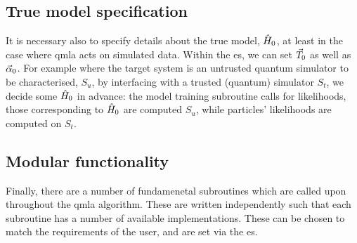 \subsection{True model specification}
It is necessary also to specify details about the \gls{true model}, $\hat{H}_0$, 
    at least in the case where \gls{qmla} acts on simulated data. 
Within the \gls{es}, we can set ${ \vec{T} }_0$ as well as $\vec{\alpha}_0$. 
For example where the target system is an untrusted quantum simulator to be characterised, 
    $S_u$, by interfacing with a trusted (quantum) simulator $S_t$, 
    we decide some $\hat{H}_0$ in advance:
    the model training subroutine calls for \glspl{likelihood}, 
    those corresponding to $\hat{H}_0$ are computed $S_u$, 
    while \glspl{particle}' \glspl{likelihood} are computed on $S_t$. 

\subsection{Modular functionality}\label{sec:modular_functionality}
Finally, there are a number of fundamenetal subroutines which are called upon throughout the \gls{qmla} algorithm. 
These are written independently such that each subroutine has a number of available implementations. 
These can be chosen to match the requirements of the user, and are set via the \gls{es}. 

